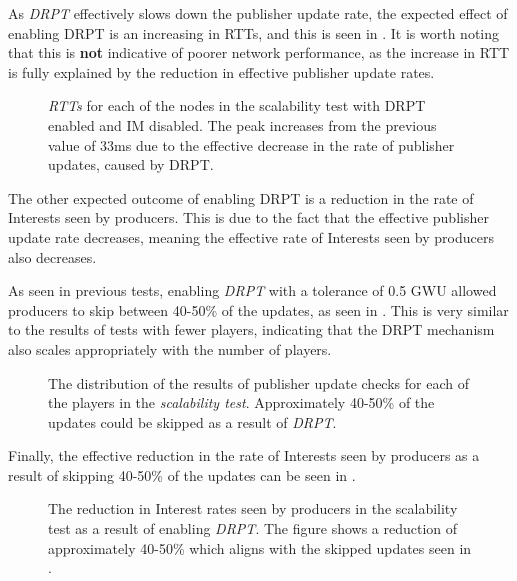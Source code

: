 As \textit{DRPT} effectively slows down the publisher update rate, the expected effect of enabling DRPT is an increasing in RTTs, and this is seen in . It is worth noting that this is \textbf{not} indicative of poorer network performance, as the increase in RTT is fully explained by the reduction in effective publisher update rates.

\begin{figure}[H]
    \centering
    \caption{\textit{RTTs} for each of the nodes in the scalability test with DRPT enabled and IM disabled. The peak increases from the previous value of 33ms due to the effective decrease in the rate of publisher updates, caused by DRPT.}
    \label{fig:eval:dr:agg-packet-times}
\end{figure}



The other expected outcome of enabling DRPT is a reduction in the rate of Interests seen by producers. This is due to the fact that the effective publisher update rate decreases, meaning the effective rate of Interests seen by producers also decreases. 

As seen in previous tests, enabling \textit{DRPT} with a tolerance of 0.5 GWU allowed producers to skip between 40-50\% of the updates, as seen in . This is very similar to the results of tests with fewer players, indicating that the DRPT mechanism also scales appropriately with the number of players.

\begin{figure}[H]
    \centering
    \caption{The distribution of the results of publisher update checks for each of the players in the \textit{scalability test}. Approximately 40-50\% of the updates could be skipped as a result of \textit{DRPT}.}
    \label{fig:eval:dr:dr-pub-throt}
\end{figure}

Finally, the effective reduction in the rate of Interests seen by producers as a result of skipping 40-50\% of the updates can be seen in .

\begin{figure}[H]
    \centering
    \caption{The reduction in Interest rates seen by producers in the scalability test as a result of enabling \textit{DRPT}. The figure shows a reduction of approximately 40-50\% which aligns with the skipped updates seen in .}
    \label{fig:eval:dr:interest-rate-impacts}
\end{figure}



